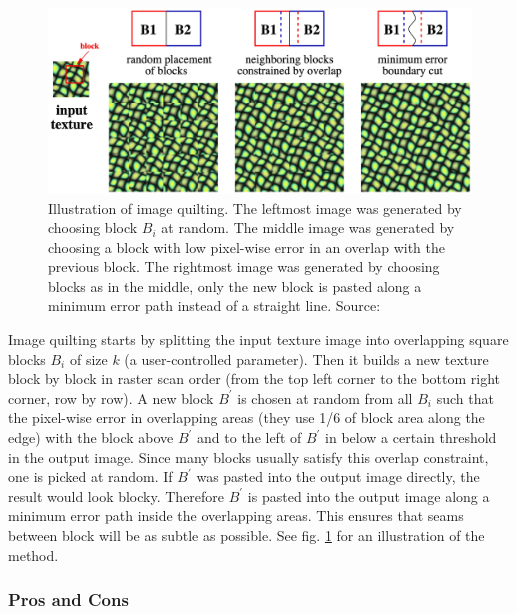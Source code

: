 \begin{figure}[ht]
    \centering
    \includegraphics[width=\textwidth]{images/02-quilting_method_compressed.jpg}
    \caption{Illustration of image quilting. The leftmost image was generated by choosing block \(B_i\) at random. The middle image was generated by choosing a block with low pixel-wise error in an overlap with the previous block. The rightmost image was generated by choosing blocks as in the middle, only the new block is pasted along a minimum error path instead of a straight line.  Source: \citet{Efros2001}}
    \label{fig:background_quilting_method}
\end{figure}

Image quilting starts by splitting the input texture image into overlapping square blocks \(B_i\) of size \(k\) (a user-controlled parameter). Then it builds a new texture block by block in raster scan order (from the top left corner to the bottom right corner, row by row). A new block \(B^{\prime}\) is chosen at random from all \(B_i\) such that the pixel-wise error in overlapping areas (they use 1/6 of block area along the edge) with the block above \(B^{\prime}\) and to the left of \(B^{\prime}\) in below a certain threshold in the output image. Since many blocks usually satisfy this overlap constraint, one is picked at random. If \(B^{\prime}\) was pasted into the output image directly, the result would look blocky. Therefore \(B^{\prime}\) is pasted into the output image along a minimum error path inside the overlapping areas. This ensures that seams between block will be as subtle as possible. See fig. \ref{fig:background_quilting_method} for an illustration of the method.

\subsubsection{Pros and Cons}
\label{section:background-texture_synthesis-patch_based-pros_and_cons}

